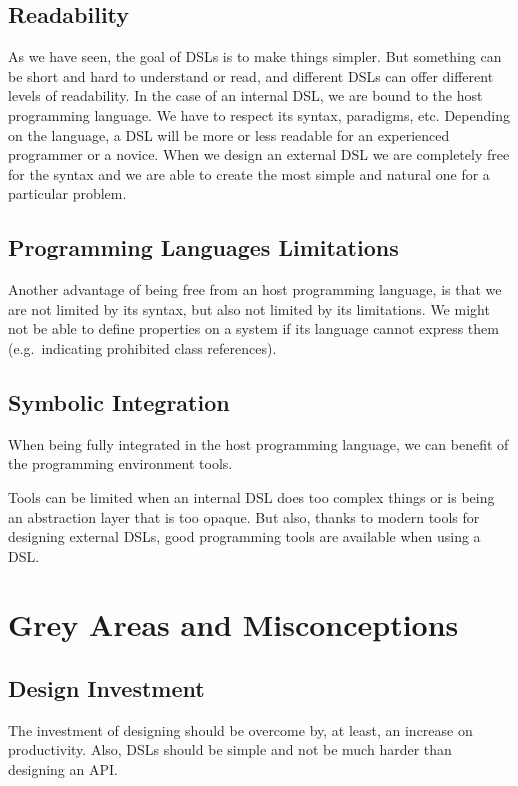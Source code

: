 \documentclass{proc}
\begin{document}
\subsection{Readability}
As we have seen, the goal of DSLs is to make things simpler. But something can
be short and hard to understand or read, and different DSLs can offer different
levels of readability. In the case of an internal DSL, we are bound to the host
programming language. We have to respect its syntax, paradigms, etc. Depending
on the language, a DSL will be more or less readable for an experienced
programmer or a novice. When we design an external DSL we are completely free
for the syntax and we are able to create the most simple and natural one for a
particular problem.

\subsection{Programming Languages Limitations}
Another advantage of being free from an host programming language, is that we
are not limited by its syntax, but also not limited by its limitations. We might
not be able to define properties on a system if its language cannot express them
(e.g.\ indicating prohibited class references).

\subsection{Symbolic Integration}
When being fully integrated in the host programming language, we can benefit of
the programming environment tools.

Tools can be limited when an internal DSL does too complex things or is being an
abstraction layer that is too opaque. But also, thanks to modern tools for
designing external DSLs, good programming tools are available when using a DSL\@.


\section{Grey Areas and Misconceptions}
\label{grey}

\subsection{Design Investment}
The investment of designing should be overcome by, at least, an increase on
productivity. Also, DSLs should be simple and not be much harder than designing
an API\@.
\end{document}
